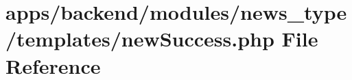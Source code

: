 \hypertarget{backend_2modules_2news__type_2templates_2new_success_8php}{\section{apps/backend/modules/news\-\_\-type/templates/new\-Success.php File Reference}
\label{backend_2modules_2news__type_2templates_2new_success_8php}
}
